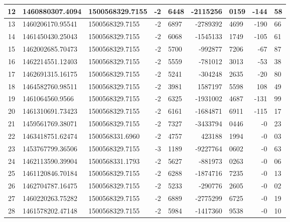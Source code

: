 \begin{table}[!ht]
\begin{center}
\begin{tabular}{|c|l|l|r@{.}l|r@{.}l|r@{.}l|}
12  &     1460880307.4094    &    1500568329.7155    &      -2 & 6448  &       -2115256 & 0159   &  -144 & 58 \\ \hline
13  &     1460206170.95541   &    1500568329.7155    &      -2 & 6897  &       -2789392 & 4699   &  -190 & 66 \\ \hline
14  &     1461450430.25043   &    1500568329.7155    &      -2 & 6068  &       -1545133 & 1749   &  -105 & 61 \\ \hline
15  &     1462002685.70473   &    1500568329.7155    &      -2 & 5700  &        -992877 & 7206   &   -67 & 87 \\ \hline
16  &     1462214551.12403   &    1500568329.7155    &      -2 & 5559  &        -781012 & 3013   &   -53 & 38 \\ \hline
17  &     1462691315.16175   &    1500568329.7155    &      -2 & 5241  &        -304248 & 2635   &   -20 & 80 \\ \hline
18  &     1464582760.98511   &    1500568329.7155    &      -2 & 3981  &        1587197 & 5598   &   108 & 49 \\ \hline
19  &     1461064560.9566    &    1500568329.7155    &      -2 & 6325  &       -1931002 & 4687   &  -131 & 99 \\ \hline
20  &     1461310691.73423   &    1500568329.7155    &      -2 & 6161  &       -1684871 & 6911   &  -115 & 17 \\ \hline
21  &     1459561769.38071   &    1500568329.7155    &      -2 & 7327  &       -3433794 & 0446   &    -0 & 23 \\ \hline
22  &     1463418751.62474   &    1500568331.6960    &      -2 & 4757  &         423188 & 1994   &    -0 & 03 \\ \hline
23  &     1453767799.36506   &    1500568329.7155    &      -3 & 1189  &       -9227764 & 0602   &    -0 & 63 \\ \hline
24  &     1462113590.39904   &    1500568331.1793    &      -2 & 5627  &        -881973 & 0263   &    -0 & 06 \\ \hline
25  &     1461120846.70184   &    1500568329.7155    &      -2 & 6288  &       -1874716 & 7235   &    -0 & 13 \\ \hline
26  &     1462704787.16475   &    1500568329.7155    &      -2 & 5233  &        -290776 & 2605   &    -0 & 02 \\ \hline
27  &     1460220263.75282   &    1500568329.7155    &      -2 & 6889  &       -2775299 & 6725   &    -0 & 19 \\ \hline
28  &     1461578202.47148   &    1500568329.7155    &      -2 & 5984  &       -1417360 & 9538   &    -0 & 10 \\ \hline

\end{tabular}
\end{center}
\end{table}
